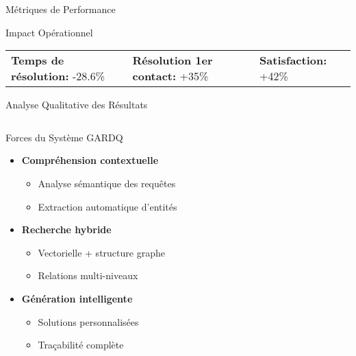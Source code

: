 \documentclass[10pt, aspectratio=169]{beamer}
\begin{document}
\begin{frame}{Métriques de Performance}
    \vspace{0.3cm}
    \begin{block}{Impact Opérationnel}
        \begin{center}
        \begin{tabular}{lll}
        \faClockO{} \textbf{Temps de résolution:} -28.6\% &
        \faCheckCircle{} \textbf{Résolution 1er contact:} +35\% &
        \faSmileO{} \textbf{Satisfaction:} +42\%
        \end{tabular}
        \end{center}
    \end{block}
\end{frame}

\begin{frame}{Analyse Qualitative des Résultats}
    \begin{columns}[T]
        \begin{column}{0.6\textwidth}
            \begin{block}{Forces du Système GARDQ}
                \begin{itemize}
                    \item \textbf{Compréhension contextuelle}
                    \begin{itemize}
                        \footnotesize
                        \item Analyse sémantique des requêtes
                        \item Extraction automatique d'entités
                    \end{itemize}
                    \item \textbf{Recherche hybride}
                    \begin{itemize}
                        \footnotesize
                        \item Vectorielle + structure graphe
                        \item Relations multi-niveaux
                    \end{itemize}
                    \item \textbf{Génération intelligente}
                    \begin{itemize}
                        \footnotesize
                        \item Solutions personnalisées
                        \item Traçabilité complète
                    \end{itemize}
                \end{itemize}
            \end{block}
        \end{column}
        

\end{columns}
\end{frame}
\end{document}
